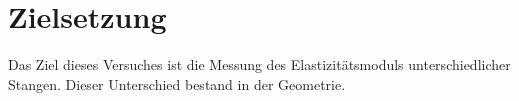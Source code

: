 \section{Zielsetzung}
\label{sec:Ziel}
Das Ziel dieses Versuches ist die Messung des Elastizitätsmoduls
unterschiedlicher Stangen. Dieser Unterschied bestand in der Geometrie.
